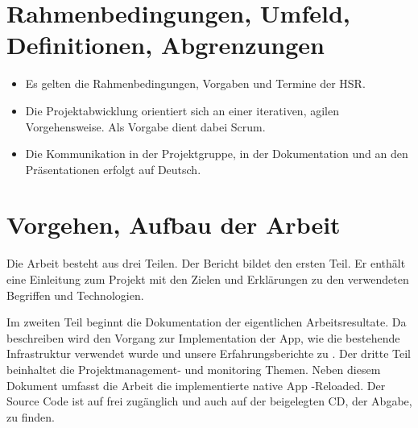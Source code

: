 \section{Rahmenbedingungen, Umfeld, Definitionen, Abgrenzungen}
\begin{itemize}
\item Es gelten die Rahmenbedingungen, Vorgaben und Termine der HSR.
\item Die Projektabwicklung orientiert sich an einer iterativen, agilen Vorgehensweise. Als Vorgabe dient dabei Scrum.
\item Die Kommunikation in der Projektgruppe, in der Dokumentation und an den Präsentationen erfolgt auf Deutsch.
\end{itemize}


\section{Vorgehen, Aufbau der Arbeit}
Die Arbeit besteht aus drei Teilen. Der Bericht bildet den ersten Teil.
Er enthält eine Einleitung zum Projekt mit den Zielen und Erklärungen zu den verwendeten Begriffen und Technologien.

Im zweiten Teil beginnt die Dokumentation der eigentlichen Arbeitsresultate. 
Da beschreiben wird den Vorgang zur Implementation
der App, wie die bestehende Infrastruktur verwendet wurde und unsere Erfahrungsberichte zu .
Der dritte Teil beinhaltet die Projektmanagement- und monitoring Themen.
Neben diesem Dokument umfasst die Arbeit die implementierte native App \kort{}-Reloaded. Der Source Code ist auf  frei zugänglich und auch auf der beigelegten CD, der Abgabe, zu finden.

